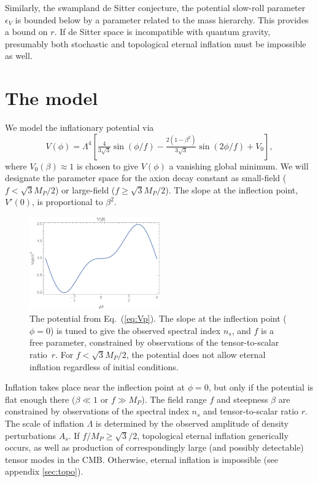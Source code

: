 \documentclass[aps,amsfonts,amsmath,prd,preprint,nofootinbib,superscriptaddress]{revtex4}
\newcommand{\Mp}{{M_{P}}}
\newcommand{\MMp}{{M_P^2}}
\newcommand{\beq}{\begin{equation}}
\newcommand{\eeq}{\end{equation}}
\begin{document}
Similarly, the swampland de Sitter conjecture, the potential slow-roll parameter $\epsilon_V$ is bounded below by a parameter related to the mass hierarchy.
This provides  \cite{Dias:2018ngv} a bound on $r$.  If de Sitter space is incompatible with quantum gravity, presumably both stochastic and topological eternal inflation
must be impossible \cite{shandera,...} as well.  


\section{The model}
 We model the inflationary potential via
\beq
V(\phi) = \Lambda^4\left[\tfrac{4}{3\sqrt{3}}\sin(\phi/f) -\tfrac{2(1 - \beta^2)}{3\sqrt{3}} \sin(2\phi/f) + V_0  \right], \label{eq:Vp}
\eeq
where $V_0(\beta) \approx 1$ is chosen to give $V(\phi)$ a vanishing global minimum.
We will designate the parameter space for the axion decay constant as small-field ($f < \sqrt{3}\Mp/2$) or large-field ($f \geq \sqrt{3}\Mp/2$). %
The slope at the inflection point, $V'(0)$, is proportional to $\beta^2$.

\begin{figure}[!h]
  \centering
    \includegraphics[width=0.5\textwidth]{figures/V.pdf}
    \caption{The potential from Eq.~(\ref{eq:Vp}).  The slope at the inflection point ($\phi = 0$) is tuned to give the observed spectral index $n_s$, and $f$ is a free parameter, constrained by 
    observations of the tensor-to-scalar ratio~$r$.  For $f < \sqrt{3}\Mp/2$, the potential does not allow eternal inflation regardless of initial conditions.}
\end{figure}


Inflation takes place near the inflection point at $\phi = 0$, but only if the potential is flat enough there ($\beta \ll 1$ or $f \gg \Mp$).
The field range $f$ and steepness $\beta$ are constrained by observations of the spectral index $n_s$ and tensor-to-scalar 
ratio $r$.   The scale of inflation $\Lambda$ is determined by the observed amplitude of density perturbations $A_s$.
If $f/\Mp \geq \sqrt{3}/2$, topological eternal inflation generically occurs, as well as production of correspondingly large (and possibly detectable) tensor modes in the CMB.   
 Otherwise, eternal inflation is impossible (see appendix \ref{sec:topo}).
\end{document}
